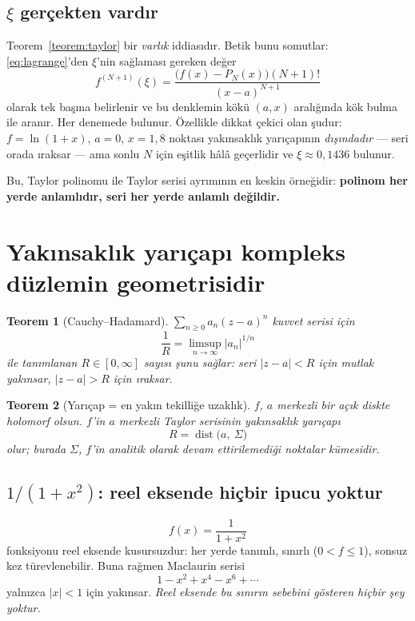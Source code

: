 \documentclass[11pt,a4paper]{article}
\theoremstyle{plain}
\newtheorem{teorem}{Teorem}[section]
\theoremstyle{definition}
\theoremstyle{remark}
\begin{document}
\subsection*{$\xi$ gerçekten vardır}

Teorem~\ref{teorem:taylor} bir \emph{varlık} iddiasıdır. Betik bunu somutlar:
\eqref{eq:lagrange}'den $\xi$'nin sağlaması gereken değer
\[
  f^{(N+1)}(\xi) = \frac{\bigl(f(x)-P_N(x)\bigr)(N+1)!}{(x-a)^{N+1}}
\]
olarak tek başına belirlenir ve bu denklemin kökü $(a,x)$ aralığında kök bulma
ile aranır. Her denemede bulunur. Özellikle dikkat çekici olan şudur:
$f = \ln(1+x)$, $a=0$, $x=1{,}8$ noktası yakınsaklık yarıçapının
\emph{dışındadır} --- seri orada ıraksar --- ama sonlu $N$ için eşitlik hâlâ
geçerlidir ve $\xi \approx 0{,}1436$ bulunur.

Bu, Taylor polinomu ile Taylor serisi ayrımının en keskin örneğidir:
\textbf{polinom her yerde anlamlıdır, seri her yerde anlamlı değildir.}

\section{Yakınsaklık yarıçapı kompleks düzlemin geometrisidir}\label{sec:yaricap}

\begin{teorem}[Cauchy--Hadamard]\label{teorem:ch}
$\sum_{n\ge 0} a_n (z-a)^n$ kuvvet serisi için
\[
  \frac{1}{R} = \limsup_{n\to\infty} |a_n|^{1/n}
\]
ile tanımlanan $R \in [0,\infty]$ sayısı şunu sağlar: seri $|z-a| < R$ için
mutlak yakınsar, $|z-a| > R$ için ıraksar.
\end{teorem}

\begin{teorem}[Yarıçap = en yakın tekilliğe uzaklık]\label{teorem:tekillik}
$f$, $a$ merkezli bir açık diskte holomorf olsun. $f$'in $a$ merkezli Taylor
serisinin yakınsaklık yarıçapı
\[
  R = \operatorname{dist}\bigl(a,\ \Sigma\bigr)
\]
olur; burada $\Sigma$, $f$'in analitik olarak devam ettirilemediği noktalar
kümesidir.
\end{teorem}

\subsection*{$1/(1+x^2)$: reel eksende hiçbir ipucu yoktur}

\[
  f(x) = \frac{1}{1+x^2}
\]
fonksiyonu reel eksende kusursuzdur: her yerde tanımlı, sınırlı ($0 < f \le 1$),
sonsuz kez türevlenebilir. Buna rağmen Maclaurin serisi
\[
  1 - x^2 + x^4 - x^6 + \cdots
\]
yalnızca $|x| < 1$ için yakınsar. \emph{Reel eksende bu sınırın sebebini
gösteren hiçbir şey yoktur.}
\end{document}
